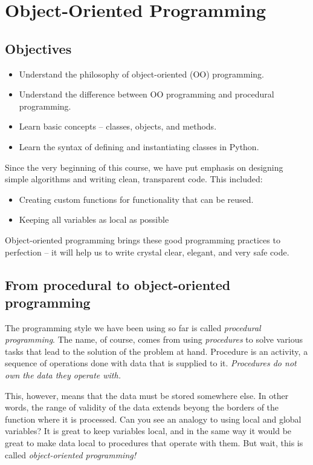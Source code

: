 
\section{Object-Oriented Programming}

\subsection{Objectives}

\begin{itemize}
\item Understand the philosophy of object-oriented (OO) programming.
\item Understand the difference between OO programming and procedural programming.
\item Learn basic concepts -- classes, objects, and methods.
\item Learn the syntax of defining and instantiating classes in Python.
\end{itemize}
Since the very beginning of this course, 
we have put emphasis on designing simple algorithms
and writing clean, transparent code. This included:
\begin{itemize}
\item Creating custom functions for functionality that can be reused.
\item Keeping all variables as local as possible
\end{itemize}
Object-oriented programming brings these good programming practices to
perfection -- it will help us to write crystal clear, elegant, and very safe code.

\subsection{From procedural to object-oriented programming}

The programming style we have been using so far is called {\em procedural programming}.
The name, of course, comes from using {\em procedures} to solve various tasks that 
lead to the solution of the problem at hand. Procedure is an activity, a sequence of operations 
done with data that is supplied to it. {\em Procedures do not own the data they 
operate with.} 

This, however, means that the data must be stored somewhere else. In other
words, the range of validity of the data extends beyong the borders of the 
function where it is processed. 
Can you see an analogy to using local and global variables? It is great
to keep variables local, and in the same way it would be great to make
data local to procedures that operate with them. But wait, this is called {\em 
object-oriented programming!}

